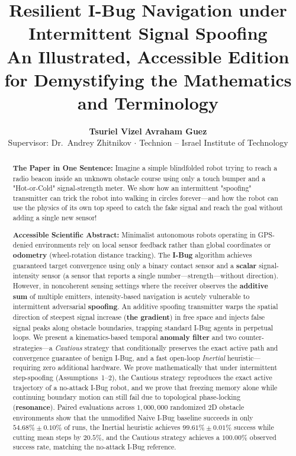 \documentclass[11pt, a4paper]{article}
\title{\vspace{-1.2em}\Large\textbf{Resilient I-Bug Navigation under Intermittent Signal Spoofing}\\
\large\textbf{An Illustrated, Accessible Edition for Demystifying the Mathematics and Terminology}}
\author{
  \textbf{Tsuriel Vizel} \quad \textbf{Avraham Guez} \\
  \small Supervisor: Dr.\ Andrey Zhitnikov $\cdot$ Technion -- Israel Institute of Technology
}
\date{}
\begin{document}
\maketitle

\begin{abstract}
\noindent
\textbf{The Paper in One Sentence:} Imagine a simple blindfolded robot trying to reach a radio beacon inside an unknown obstacle course using only a touch bumper and a "Hot-or-Cold" signal-strength meter. We show how an intermittent "spoofing" transmitter can trick the robot into walking in circles forever—and how the robot can use the physics of its own top speed to catch the fake signal and reach the goal without adding a single new sensor!

\smallskip
\noindent
\textbf{Accessible Scientific Abstract:}
Minimalist autonomous robots operating in GPS-denied environments rely on local sensor feedback rather than global coordinates or \textbf{odometry} (wheel-rotation distance tracking). The \textbf{I-Bug} algorithm achieves guaranteed target convergence using only a binary contact sensor and a \textbf{scalar} signal-intensity sensor (a sensor that reports a single number—strength—without direction). However, in noncoherent sensing settings where the receiver observes the \textbf{additive sum} of multiple emitters, intensity-based navigation is acutely vulnerable to intermittent adversarial \textbf{spoofing}. An additive spoofing transmitter warps the spatial direction of steepest signal increase (\textbf{the gradient}) in free space and injects false signal peaks along obstacle boundaries, trapping standard I-Bug agents in perpetual loops. We present a kinematics-based temporal \textbf{anomaly filter} and two counter-strategies—a \textit{Cautious} strategy that conditionally preserves the exact active path and convergence guarantee of benign I-Bug, and a fast open-loop \textit{Inertial} heuristic—requiring zero additional hardware. We prove mathematically that under intermittent step-spoofing (Assumptions~1--2), the Cautious strategy reproduces the exact active trajectory of a no-attack I-Bug robot, and we prove that freezing memory alone while continuing boundary motion can still fail due to topological phase-locking (\textbf{resonance}). Paired evaluations across $1,000,000$ randomized 2D obstacle environments show that the unmodified Naive I-Bug baseline succeeds in only $54.68\% \pm 0.10\%$ of runs, the Inertial heuristic achieves $99.61\% \pm 0.01\%$ success while cutting mean steps by $20.5\%$, and the Cautious strategy achieves a $\mathbf{100.00\%}$ observed success rate, matching the no-attack I-Bug reference.
\end{abstract}
\end{document}

